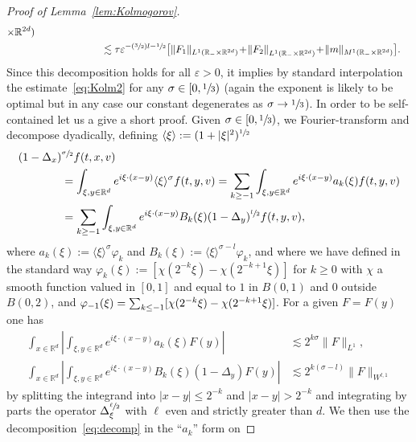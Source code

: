 \documentclass[11pt]{article}
\numberwithin{equation}{section}\let\oldbigcup\bigcup
\newcommand{\Psfrac}[2]{(\sfrac{#1}{#2})}
\theoremstyle{definition}
\theoremstyle{remark}
\newcommand\R{{\mathbb R}}
\let\var\varepsilon
\begin{document}
\begin{proof}[Proof of Lemma~\ref{lem:Kolmogorov}]
\begin{align*}
{\times \R^{2d})} \\
& \hphantom{\| f_\var \|_{L^1(\R_- \times \R^{2d})}} \lesssim
\tau \var^{-\Psfrac32 l -\sfrac12}
\bigl[ \| F_1 \|_{L^1(\R_- \times \R^{2d})} \!+\!
\left\| F_2 \right\|_{L^1(\R_- \times \R^{2d})}
\!+\! \| m \|_{M^1(\R_- \times \R^{2d})} \bigr].
\end{align*}
Since this decomposition holds for all $\var >0$, it implies by
standard interpolation the estimate~\eqref{eq:Kolm2} for any
$\sigma \in [0,\sfrac{1}{3})$ (again the exponent is likely to
be optimal but in any case our constant degenerates as
$\sigma \to \sfrac{1}{3}$). In order to be self-contained let us
a give a short proof. Given $\sigma \in [0,\sfrac13)$, we
Fourier-transform and decompose dyadically, defining
$\langle \xi \rangle:= (1+|\xi|^2)^{\sfrac12}$
\begin{equation}
\label{eq:decomp}
\begin{aligned}
(1-\Delta_x)&^{\sfrac{\sigma}{2}} f(t,x,v) \\
&= \int_{\xi,y \in \R^d} e^{i \xi
\cdot (x-y)} \langle \xi \rangle^\sigma
f(t,y,v)
= \sum_{k \ge -1} \int_{\xi,y \in \R^d} e^{i \xi
\cdot (x-y)} a_k(\xi) f(t,y,v) \\
&= \sum_{k \ge -1} \int_{\xi,y \in \R^d} e^{i \xi
\cdot (x-y)} B_k(\xi) (1-\Delta_y)^{\sfrac{l}{2}} f(t,y,v),
\end{aligned}
\end{equation}
where $a_k(\xi) := \langle \xi \rangle^\sigma \varphi_k$ and
$B_k(\xi) := \langle \xi \rangle^{\sigma-l} \varphi_k$, and
where we have defined in the standard way
$\varphi_k(\xi) := [ \chi(2^{-k}\xi) - \chi(2^{-k+1} \xi) ]$
for $k \ge 0$ with $\chi$ a smooth function valued in $[0,1]$
and equal to $1$ in $B(0,1)$ and $0$ outside $B(0,2)$, and
$\varphi_{-1}(\xi) =\nobreak \sum_{k \le -1} [ \chi(2^{-k}\xi) -\nobreak
\chi(2^{-k+1} \xi) ]$. For a given $F=F(y)$ one has
\begin{align*}
\int_{x \in \R^d} \left| \int_{\xi,y \in \R^d} e^{i \xi
\cdot (x-y)} a_k(\xi) F(y)
\right| &\lesssim 2^{k\sigma} \| F \|_{L^1}, \\
\int_{x \in \R^d} \left| \int_{\xi,y \in \R^d} e^{i \xi
\cdot (x-y)} B_k(\xi) (1-\Delta_y) F(y)
\right| &\lesssim 2^{k(\sigma-l)} \| F \|_{W^{l,1}}
\end{align*}
by splitting the integrand into $|x-y| \le 2^{-k}$ and
$|x-y| > 2^{-k}$ and integrating by parts the operator
$\Delta_\xi^{\sfrac{\ell}{2}}$ with $\ell$ even and strictly
greater than $d$. We then use the
decomposition~\eqref{eq:decomp} in the ``$a_k$'' form on

\end{proof}
\end{document}
